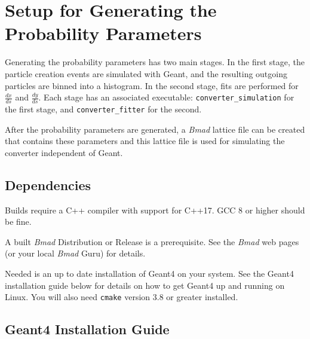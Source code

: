 \documentclass[12pt]{article}
\newcommand{\dxds}{\frac{dx}{ds}}
\newcommand{\dyds}{\frac{dy}{ds}}
\newcommand{\exes}{\texttt{converter\_simulation}\xspace}
\newcommand{\exef}{\texttt{converter\_fitter}\xspace}
\newcommand{\bmad}{\textit{Bmad}\xspace}
\begin{document}
\newpage
\section{Setup for Generating the Probability Parameters}

Generating the probability parameters has two main stages. In the first stage, the particle creation
events are simulated with Geant, and the resulting outgoing particles are binned into a
histogram. In the second stage, fits are performed for $\dxds$ and $\dyds$.  Each stage has an
associated executable: \exes for the first stage, and \exef for the second.

After the probability parameters are generated, a \bmad lattice file can be created that contains
these parameters and this lattice file is used for simulating the converter independent of Geant.

\subsection{Dependencies}
\label{s:deps}

Builds require a C++ compiler with support for C++17. GCC 8 or higher should be fine.

A built \bmad Distribution or Release is a prerequisite. See the \bmad web pages (or your local
\bmad Guru) for details.

Needed is an up to date installation of Geant4 on your system. See the Geant4 installation guide
below for details on how to get Geant4 up and running on Linux.  You will also need \texttt{cmake}
version 3.8 or greater installed.

\subsection{Geant4 Installation Guide}
\end{document}

